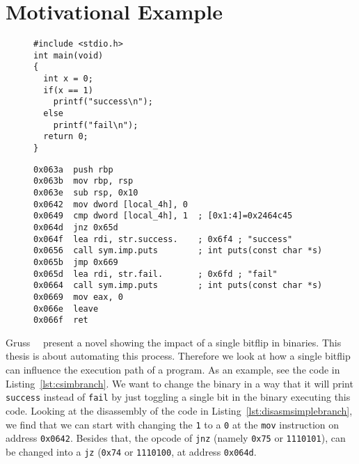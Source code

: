 \section{Motivational Example}\label{sec:motivation}

\begin{figure}
\begin{minipage}{\linewidth}
\begin{lstlisting}[style=CStyle,
                   caption={Simple branching code to illustrate how a single
bitflip can change the execution path.},
                   label={lst:csimbranch}]
#include <stdio.h>
int main(void)
{
  int x = 0;
  if(x == 1)
    printf("success\n");
  else
    printf("fail\n");
  return 0;
}
\end{lstlisting}
\end{minipage}
\end{figure}

\begin{figure}
\begin{minipage}{\linewidth}
\begin{lstlisting}[style=nasm,
                   caption={Disassemby of the main function created by the
code in Listing~\ref{lst:csimbranch}. Shows disassembly at the given address
range inside the ELF file, starting at \texttt{0x063a}.},
                   label={lst:disasmsimplebranch}]
0x063a  push rbp
0x063b  mov rbp, rsp
0x063e  sub rsp, 0x10
0x0642  mov dword [local_4h], 0
0x0649  cmp dword [local_4h], 1  ; [0x1:4]=0x2464c45
0x064d  jnz 0x65d
0x064f  lea rdi, str.success.    ; 0x6f4 ; "success"
0x0656  call sym.imp.puts        ; int puts(const char *s)
0x065b  jmp 0x669
0x065d  lea rdi, str.fail.       ; 0x6fd ; "fail"
0x0664  call sym.imp.puts        ; int puts(const char *s)
0x0669  mov eax, 0
0x066e  leave
0x066f  ret
\end{lstlisting}
\end{minipage}
\end{figure}

Gruss~\etal~\cite{flipinthewall} present a novel showing the impact of a single
bitflip in binaries. This thesis is about automating this process. Therefore we
look at how a single bitflip can influence the execution path of a program. As
an example, see the code in Listing~\ref{lst:csimbranch}. We want to change the
binary in a way that it will print \texttt{success} instead of \texttt{fail} by
just toggling a single bit in the binary executing this code. Looking at the
disassembly of the code in Listing~\ref{lst:disasmsimplebranch}, we find that we
can start with changing the \texttt{1} to a \texttt{0} at the \texttt{mov}
instruction on address \texttt{0x0642}. Besides that, the opcode of
\texttt{jnz} (namely \texttt{0x75}  or \texttt{1110101}), can be changed into a
\texttt{jz} (\texttt{0x74} or \texttt{1110100}, at address \texttt{0x064d}.

